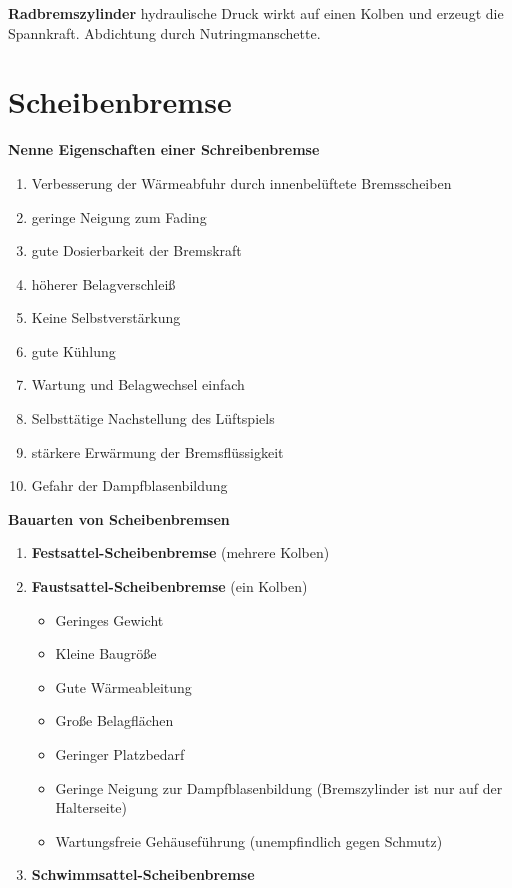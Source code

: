 \textbf{Radbremszylinder} hydraulische Druck wirkt auf einen Kolben und
erzeugt die Spannkraft. Abdichtung durch Nutringmanschette.

\newpage

\section{Scheibenbremse}\label{scheibenbremse}

\textbf{Nenne Eigenschaften einer Schreibenbremse}

\begin{enumerate}
\item
  Verbesserung der Wärmeabfuhr durch innenbelüftete Bremsscheiben
\item
  geringe Neigung zum Fading
\item
  gute Dosierbarkeit der Bremskraft
\item
  höherer Belagverschleiß
\item
  Keine Selbstverstärkung
\item
  gute Kühlung
\item
  Wartung und Belagwechsel einfach
\item
  Selbsttätige Nachstellung des Lüftspiels
\item
  stärkere Erwärmung der Bremsflüssigkeit
\item
  Gefahr der Dampfblasenbildung
\end{enumerate}

\textbf{Bauarten von Scheibenbremsen}

\begin{enumerate}
\item
  \textbf{Festsattel-Scheibenbremse} (mehrere Kolben)
\item
  \textbf{Faustsattel-Scheibenbremse} (ein Kolben)

  \begin{itemize}
  \item
    Geringes Gewicht
  \item
    Kleine Baugröße
  \item
    Gute Wärmeableitung
  \item
    Große Belagflächen
  \item
    Geringer Platzbedarf
  \item
    Geringe Neigung zur Dampfblasenbildung (Bremszylinder ist nur auf
    der Halterseite)
  \item
    Wartungsfreie Gehäuseführung (unempfindlich gegen Schmutz)
  \end{itemize}
\item
  \textbf{Schwimmsattel-Scheibenbremse}
\end{enumerate}

